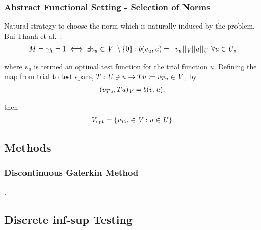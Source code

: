 \begin{frame}
\frametitle{Abstract Functional Setting - Selection of Norms}

Natural strategy to choose the norm which is naturally induced by the problem. Bui-Thanh
et al.~\cite[Theorem ]{BuiThanh2013}:
\begin{align} \label{eq:bui_thanh_2-6}
M = \gamma_h = 1
\iff
\exists v_u \in \mathit{{{V}}}\ \setminus \{0\} :
b(v_u,u) = ||v_u||_{\mathit{{{V}}}} ||u||_{\mathit{{{U}}}}\ \forall u \in \mathit{{{U}}},
\end{align}

where $v_u$ is termed an optimal test function for the trial function $u$. Defining the map from trial to test space, $T :
\mathit{{{U}}} \ni u \rightarrow Tu \coloneqq v_{Tu} \in \mathit{{{V}}} $, by
\begin{align}
(v_{Tu},Tu)_{\mathit{{{V}}}} = b(v,u),
\end{align}

then
\begin{align} \label{eq:def_discrete_test_space_alt}
\mathit{{{V}}}_\text{opt} = \{ v_{T u} \in \mathit{{{V}}} : u \in \mathit{{{U}}} \}.
\end{align}

\end{frame}

\subsection{Methods}

\begin{frame}
\frametitle{Discontinuous Galerkin Method}

.

\end{frame}

\subsection{Discrete inf-sup Testing}

